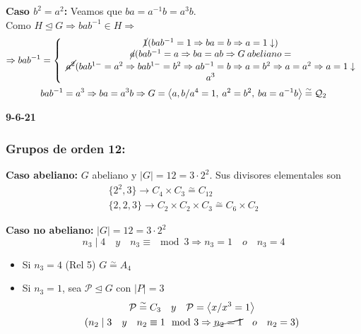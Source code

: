 \documentclass{article}
\begin{document}
\begin{enumerate}[(1)]
\textbf{Caso $b^2=a^2$:} Veamos que $ba=a^{-1}b=a^3b$.\\

Como $H\unlhd G\Rightarrow bab^{-1}\in H\Rightarrow$
\begin{gather*}
\Rightarrow bab^{-1}=\left\lbrace \begin{array}{c}
\cancel{1} (bab^{-1}=1\Rightarrow ba=b\Rightarrow a=1\downarrow)\\
\cancel{a} (bab^{-1}=a\Rightarrow ba=ab\Rightarrow G\:abeliano=\\
\cancel{a^2} (bab^{1-}=a^2\Rightarrow bab^{1-}=b^2\Rightarrow ab^{-1}=b\Rightarrow a=b^2\Rightarrow a= a^2\Rightarrow a=1\downarrow\\
a^3
\end{array}\right. \\
bab^{-1}=a^3\Rightarrow ba=a^3b\Rightarrow G=\left\langle a,b/a^4=1,\:a^2=b^2,\:ba=a^{-1}b\right\rangle \overset{\sim}{=} \mathcal{Q}_2
\end{gather*}
\end{enumerate}

\textbf{9-6-21}\\

\subsubsection{Grupos de orden 12:}

\textbf{Caso abeliano:} $G$ abeliano y $|G|=12=3\cdot 2^2$. Sus divisores elementales son
\begin{gather*}
\{2^2,3\}\longrightarrow C_4\times C_3\overset{\sim}{=} C_{12}\\
\{2,2,3\}\longrightarrow C_2\times C_2\times C_3\overset{\sim}{=} C_6\times C_2
\end{gather*}

\textbf{Caso no abeliano:} $|G|=12=3\cdot 2^2$
\begin{equation*}
n_3\mid 4\quad y\quad n_3\equiv \mod{3}\Rightarrow n_3=1\quad o\quad n_3=4
\end{equation*}

\begin{itemize}
\item Si $n_3=4$ (Rel 5) $G\overset{\sim}{=} A_4$

\item Si $n_3=1$, sea $\mathcal{P}\unlhd G$ con $|P|=3$
\begin{gather*}
\mathcal{P}\overset{\sim}{=} C_3\quad y\quad \mathcal{P}=\left\langle x/x^3=1\right\rangle\\
(n_2\mid 3\quad y\quad n_2\equiv 1\mod{3}\Rightarrow \cancel{n_2=1}\quad o\quad n_2=3)
\end{gather*}
\end{itemize}
\end{document}
